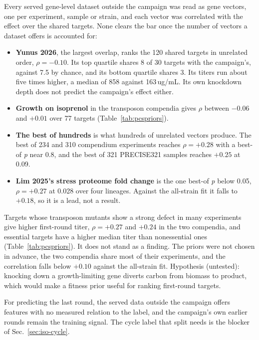  Every served gene-level dataset outside the
campaign was read as gene vectors, one per experiment, sample or strain, and each
vector was correlated with the effect over the shared targets. None clears the bar once
the number of vectors a dataset offers is accounted for:

\begin{itemize}[nosep,leftmargin=1.4em]
\item \textbf{Yunus 2026}, the largest overlap, ranks the 120 shared targets in
unrelated order, $\rho = -0.10$. Its top quartile shares 8 of 30 targets with the
campaign's, against 7.5 by chance, and its bottom quartile shares 3. Its titers run
about five times higher, a median of 858 against 163\,ug/mL. Its own knockdown depth
does not predict the campaign's effect either.
\item \textbf{Growth on isoprenol} in the transposon compendia gives $\rho$ between
$-0.06$ and $+0.01$ over 77 targets (Table~\ref{tab:pcspriors}).
\item \textbf{The best of hundreds} is what hundreds of unrelated vectors produce. The
best of 234 and 310 compendium experiments reaches $\rho = +0.28$ with a best-of
\emph{p} near 0.8, and the best of 321 PRECISE321 samples reaches $+0.25$ at 0.09.
\item \textbf{Lim 2025's stress proteome fold change} is the one best-of \emph{p} below
0.05, $\rho = +0.27$ at 0.028 over four lineages. Against the all-strain fit it falls
to $+0.18$, so it is a lead, not a result.
\end{itemize}

 Targets whose transposon mutants show a strong
defect in many experiments give higher first-round titer, $\rho = +0.27$ and $+0.24$ in
the two compendia, and essential targets have a higher median titer than nonessential
ones (Table~\ref{tab:pcspriors}). It does not stand as a finding. The priors were not
chosen in advance, the two compendia share most of their experiments, and the
correlation falls below $+0.10$ against the all-strain fit. Hypothesis (untested):
knocking down a growth-limiting gene diverts carbon from biomass to product, which
would make a fitness prior useful for ranking first-round targets.

 For predicting the last round, the served data outside the
campaign offers features with no measured relation to the label, and the campaign's own
earlier rounds remain the training signal. The cycle label that split needs is the
blocker of Sec.~\ref{sec:iso-cycle}.


